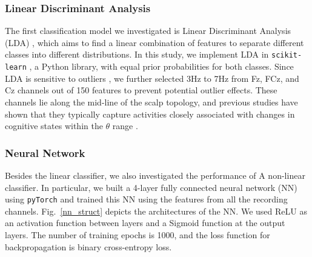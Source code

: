 \documentclass[journal]{IEEEtran}
\begin{document}
\subsubsection{Linear Discriminant Analysis}
\label{lda_method}
The first classification model we investigated is Linear Discriminant Analysis (LDA) \cite{balakrishnama1998LDA}, 
which aims to find a linear combination of features to separate different classes into different distributions.
In this study, we implement LDA in \texttt{scikit-learn} \cite{scikit-learn}, a Python library, with equal prior probabilities for both classes.
Since LDA is sensitive to outliers \cite{buyukozturk2008lda_outlier}, we further selected 3Hz to 7Hz from Fz, FCz, and Cz channels out of 150 features to prevent potential outlier effects.
These channels lie along the mid-line of the scalp topology, and previous studies have shown that they typically capture activities closely associated with changes in cognitive states within the \(\theta\) range \cite{attallah2020frontal_electrode}.

\subsubsection{Neural Network}
Besides the linear classifier, we also investigated the performance of A non-linear classifier.
In particular, we built a 4-layer fully connected neural network (NN) using \texttt{pyTorch} \cite{NEURIPS2019_9015pytorch} and trained this NN using the features from all the recording channels.
Fig.~\ref{nn_struct} depicts the architectures of the NN.
We used ReLU as an activation function between layers and a Sigmoid function at the output layers.
The number of training epochs is 1000, and the loss function for backpropagation is binary cross-entropy loss.
\end{document}
